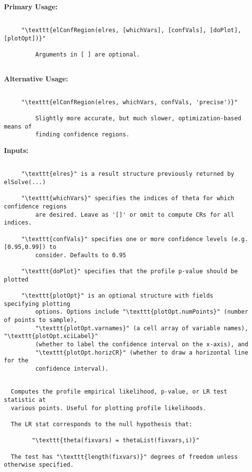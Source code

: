 {\small\textbf{Primary Usage:}}
\begin{lstlisting}
 
     "\texttt{elConfRegion(elres, [whichVars], [confVals], [doPlot], [plotOpt])}"
 
         Arguments in [ ] are optional.
 
 \end{lstlisting}
{\small\textbf{Alternative Usage:}}
\begin{lstlisting}
 
     "\texttt{elConfRegion(elres, whichVars, confVals, 'precise')}"
 
         Slightly more accurate, but much slower, optimization-based means of
         finding confidence regions.
 \end{lstlisting}
{\small\textbf{Inputs:}}
\begin{lstlisting}
 
     "\texttt{elres}" is a result structure previously returned by elSolve(...)
 
     "\texttt{whichVars}" specifies the indices of theta for which confidence regions
         are desired. Leave as '[]' or omit to compute CRs for all indices.
 
     "\texttt{confVals}" specifies one or more confidence levels (e.g. [0.95,0.99]) to
         consider. Defaults to 0.95
 
     "\texttt{doPlot}" specifies that the profile p-value should be plotted
 
     "\texttt{plotOpt}" is an optional structure with fields specifying plotting
         options. Options include "\texttt{plotOpt.numPoints}" (number of points to sample),
         "\texttt{plotOpt.varnames}" (a cell array of variable names), "\texttt{plotOpt.xciLabel}"
         (whether to label the confidence interval on the x-axis), and
         "\texttt{plotOpt.horizCR}" (whether to draw a horizontal line for the
         confidence interval).
 

\end{lstlisting}
\begin{lstlisting}
  Computes the profile empirical likelihood, p-value, or LR test statistic at
  various points. Useful for plotting profile likelihoods.
 
  The LR stat corresponds to the null hypothesis that:
 
        "\texttt{theta(fixvars) = thetaList(fixvars,i)}"
 
  The test has "\texttt{length(fixvars)}" degrees of freedom unless otherwise specified.
 \end{lstlisting}
